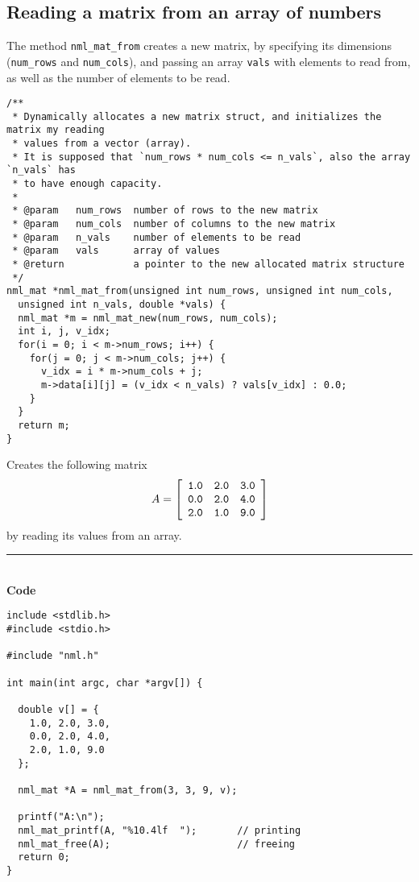 \subsection{Reading a matrix from an array of numbers}

The method {\tt nml\_mat\_from} creates a new matrix, by specifying its dimensions ({\tt num\_rows} and {\tt num\_cols}), and passing an array {\tt vals} with elements to read from, as well as the number of elements to be read.

\begin{verbatim}
/**
 * Dynamically allocates a new matrix struct, and initializes the matrix my reading
 * values from a vector (array).
 * It is supposed that `num_rows * num_cols <= n_vals`, also the array `n_vals` has
 * to have enough capacity.
 *
 * @param   num_rows  number of rows to the new matrix
 * @param   num_cols  number of columns to the new matrix
 * @param   n_vals    number of elements to be read
 * @param   vals      array of values
 * @return            a pointer to the new allocated matrix structure 
 */
nml_mat *nml_mat_from(unsigned int num_rows, unsigned int num_cols, 
  unsigned int n_vals, double *vals) {
  nml_mat *m = nml_mat_new(num_rows, num_cols);
  int i, j, v_idx;
  for(i = 0; i < m->num_rows; i++) {
    for(j = 0; j < m->num_cols; j++) {
      v_idx = i * m->num_cols + j;
      m->data[i][j] = (v_idx < n_vals) ? vals[v_idx] : 0.0;
    }
  }
  return m;
}
\end{verbatim}

\example \textsf{Creates the following matrix}
$$
A = \left[
\begin{array}{rrr}
\tt 1.0 & \tt 2.0 & \tt 3.0 \\
\tt 0.0 & \tt 2.0 & \tt 4.0 \\
\tt 2.0 & \tt 1.0 & \tt 9.0
\end{array}
\right]
$$
\textsf{by reading its values from an array}.

\rule{80mm}{0.5pt}\\
{\bf Code}
\begin{verbatim}
include <stdlib.h>
#include <stdio.h>

#include "nml.h"

int main(int argc, char *argv[]) {

  double v[] = {
    1.0, 2.0, 3.0,
    0.0, 2.0, 4.0,
    2.0, 1.0, 9.0
  };

  nml_mat *A = nml_mat_from(3, 3, 9, v);

  printf("A:\n");
  nml_mat_printf(A, "%10.4lf  ");       // printing
  nml_mat_free(A);                      // freeing
  return 0;
}
\end{verbatim}

